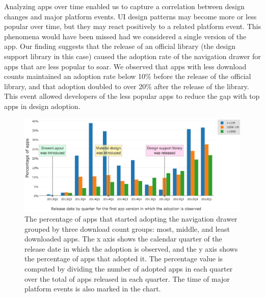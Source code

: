 Analyzing apps over time enabled us to capture a correlation between design changes and major platform events.
UI design patterns may become more or less popular over time, but they may react positively to a related platform event.
This phenomena would have been missed had we considered a single version of the app.
Our finding suggests that the release of an official library (the design support library in this case) caused the adoption rate of the navigation drawer for apps that are less popular to soar.
We observed that apps with less download counts maintained an adoption rate below 10\% before the release of the official library, and that adoption doubled to over 20\% after the release of the library.
This event allowed developers of the less popular apps to reduce the gap with top apps in design adoption.
\begin{figure}[H]
	\includegraphics[scale=0.5]{figures/findings/navdrawer_by_quarter_grouped_by_downloads.png}
	\caption{The percentage of apps that started adopting the navigation drawer grouped by three download count groups: most, middle, and least downloaded apps. The x axis shows the calendar quarter of the release date in which the adoption is observed, and the y axis shows the percentage of apps that adopted it. The percentage value is computed by dividing the number of adopted apps in each quarter over the total of apps released in each quarter. The time of major platform events is also marked in the chart.}
	\label{fig:navdrawer_quarter_download}
\end{figure}

